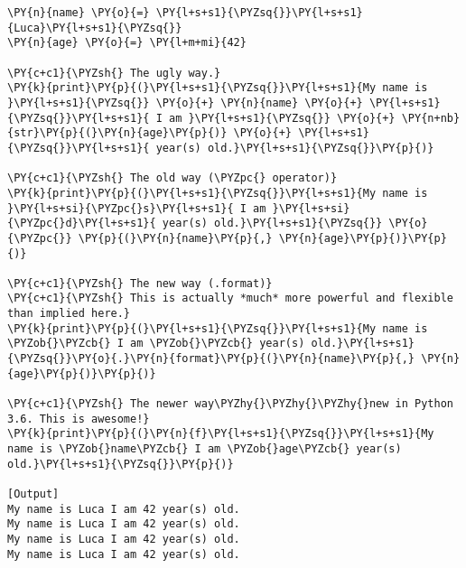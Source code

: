 \begin{Verbatim}[label=\makebox{\url{https://github.com/lucabaldini/cmepda/tree/master/slides/latex/snippets/string\_formatting.py}},commandchars=\\\{\}]
\PY{n}{name} \PY{o}{=} \PY{l+s+s1}{\PYZsq{}}\PY{l+s+s1}{Luca}\PY{l+s+s1}{\PYZsq{}}
\PY{n}{age} \PY{o}{=} \PY{l+m+mi}{42}

\PY{c+c1}{\PYZsh{} The ugly way.}
\PY{k}{print}\PY{p}{(}\PY{l+s+s1}{\PYZsq{}}\PY{l+s+s1}{My name is }\PY{l+s+s1}{\PYZsq{}} \PY{o}{+} \PY{n}{name} \PY{o}{+} \PY{l+s+s1}{\PYZsq{}}\PY{l+s+s1}{ I am }\PY{l+s+s1}{\PYZsq{}} \PY{o}{+} \PY{n+nb}{str}\PY{p}{(}\PY{n}{age}\PY{p}{)} \PY{o}{+} \PY{l+s+s1}{\PYZsq{}}\PY{l+s+s1}{ year(s) old.}\PY{l+s+s1}{\PYZsq{}}\PY{p}{)}

\PY{c+c1}{\PYZsh{} The old way (\PYZpc{} operator)}
\PY{k}{print}\PY{p}{(}\PY{l+s+s1}{\PYZsq{}}\PY{l+s+s1}{My name is }\PY{l+s+si}{\PYZpc{}s}\PY{l+s+s1}{ I am }\PY{l+s+si}{\PYZpc{}d}\PY{l+s+s1}{ year(s) old.}\PY{l+s+s1}{\PYZsq{}} \PY{o}{\PYZpc{}} \PY{p}{(}\PY{n}{name}\PY{p}{,} \PY{n}{age}\PY{p}{)}\PY{p}{)}

\PY{c+c1}{\PYZsh{} The new way (.format)}
\PY{c+c1}{\PYZsh{} This is actually *much* more powerful and flexible than implied here.}
\PY{k}{print}\PY{p}{(}\PY{l+s+s1}{\PYZsq{}}\PY{l+s+s1}{My name is \PYZob{}\PYZcb{} I am \PYZob{}\PYZcb{} year(s) old.}\PY{l+s+s1}{\PYZsq{}}\PY{o}{.}\PY{n}{format}\PY{p}{(}\PY{n}{name}\PY{p}{,} \PY{n}{age}\PY{p}{)}\PY{p}{)}

\PY{c+c1}{\PYZsh{} The newer way\PYZhy{}\PYZhy{}\PYZhy{}new in Python 3.6. This is awesome!}
\PY{k}{print}\PY{p}{(}\PY{n}{f}\PY{l+s+s1}{\PYZsq{}}\PY{l+s+s1}{My name is \PYZob{}name\PYZcb{} I am \PYZob{}age\PYZcb{} year(s) old.}\PY{l+s+s1}{\PYZsq{}}\PY{p}{)}

[Output]
My name is Luca I am 42 year(s) old.
My name is Luca I am 42 year(s) old.
My name is Luca I am 42 year(s) old.
My name is Luca I am 42 year(s) old.
\end{Verbatim}